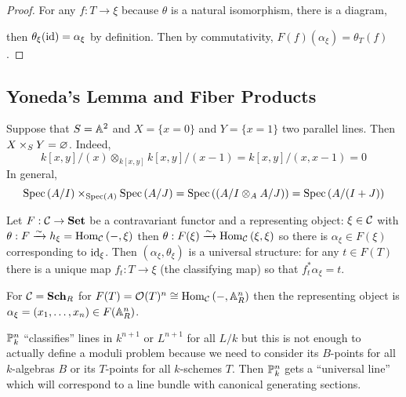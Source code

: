 \documentclass[12pt]{article}
\begin{document}
\begin{proof}
For any $f : T \to \xi$ because $\theta$ is a natural isomorphism, there is a diagram,
\begin{center}
\end{center}
then $\theta_\xi(\id) = \alpha_\xi$ by definition. Then by commutativity, $F(f)(\alpha_\xi) = \theta_T(f)$.
\end{proof}

\subsection{Yoneda's Lemma and Fiber Products}

\begin{example}
Suppose that $S = \A^2$ and $X = \{ x = 0 \}$ and $Y = \{ x = 1 \}$ two parallel lines. Then $X \times_S Y = \empty$. Indeed,
\[ k[x,y]/(x) \otimes_{k[x,y]} k[x,y]/(x-1) = k[x,y]/(x,x-1) = 0 \]
In general,
\[ \Spec{A/I} \times_{\Spec{A}} \Spec{A/J} = \Spec{(A/I \otimes_A A/J)} = \Spec{A / (I + J)} \]
\end{example}

\begin{lemma}
Let $F : \C \to \mathbf{Set}$ be a contravariant functor and a representing object: $\xi \in \C$ with $\theta : F \iso h_\xi = \Hom{\C}{-}{\xi}$ then $\theta : F(\xi) \iso \Hom{\C}{\xi}{\xi}$ so there is $\alpha_\xi \in F(\xi)$ corresponding to $\id_\xi$. Then $(\alpha_\xi, \theta_\xi)$ is a universal structure: for any $t \in F(T)$ there is a unique map $f_t : T \to \xi$ (the classifying map) so that $f_t^* \alpha_\xi = t$.
\end{lemma}

\begin{example}
For $\C = \mathbf{Sch}_R$ for $F(T) = \struct{}(T)^n \cong \Hom{\C}{-}{\A^n_R}$ then the representing object is $\alpha_\xi = (x_1, \dots, x_n) \in F(\A^n_R)$.
\end{example}

\begin{example}
$\P^n_k$ ``classifies'' lines in $k^{n+1}$ or $L^{n+1}$ for all $L/k$ but this is not enough to actually define a moduli problem because we need to consider its $B$-points for all $k$-algebras $B$ or its $T$-points for all $k$-schemes $T$. Then $\P^n_k$ gets a ``universal line'' which will correspond to a line bundle with canonical generating sections.
\end{example}
\end{document}
